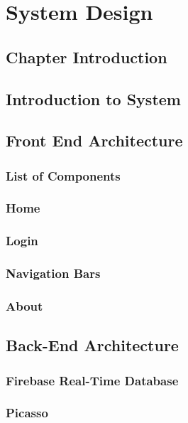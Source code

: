 \chapter{System Design}

\section{Chapter Introduction}

\section{Introduction to System}

\section{Front End Architecture}
\subsection{List of Components}
\subsection{Home}
\subsection{Login}
\subsection{Navigation Bars}
\subsection{About}

\section{Back-End Architecture}
\subsection{Firebase Real-Time Database}
\subsection{Picasso}